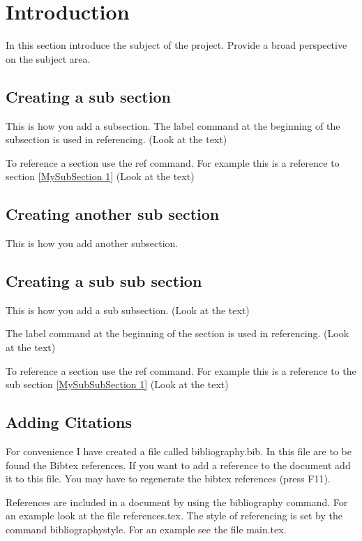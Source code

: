 \label{MySection 1}
\section{Introduction}

In this section introduce the subject of the project. Provide a broad perspective on the subject area.


\label{MySubSection 1}
\subsection{Creating a sub section}
This is how you add a subsection.
The label command at the beginning of the subsection is used in referencing. (Look at the text)

To reference a section use the ref command. For example this is a reference to section \ref{MySubSection 1} (Look at the text)


\label{MySubSection 2}
\subsection{Creating another sub section}
This is how you add another subsection.


\label{MySubSubSection 1}
\subsection{Creating a sub sub section}
This is how you add a sub subsection. (Look at the text)

The label command at the beginning of the section is used in referencing. (Look at the text)

To reference a section use the ref command. For example this is a reference to the sub section \ref{MySubSubSection 1} (Look at the text)


\label{MySubSection 3}
\subsection{Adding Citations}

For convenience I have created a file called bibliography.bib. In this file are to be found the Bibtex references. If you want to add a reference to the document add it to this file. You may have to regenerate the bibtex references (press F11).

References are included in a document by using the bibliography command. For an example look at the file references.tex.
The style of referencing is set by the command bibliographystyle. For an example see the file main.tex.

